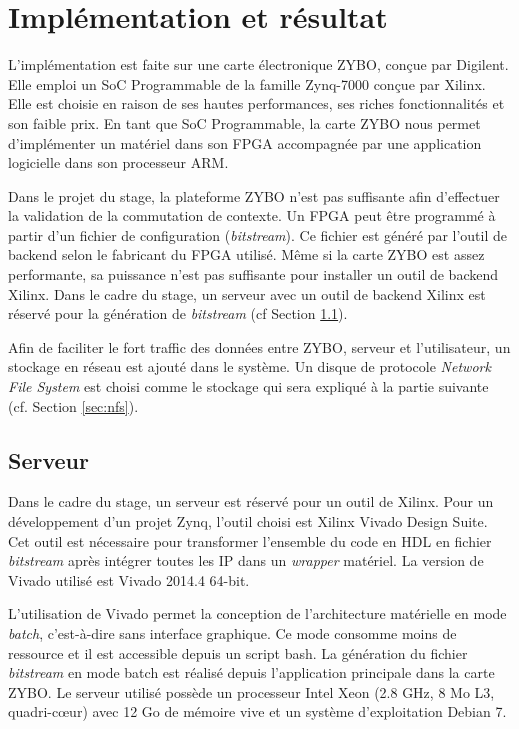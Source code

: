 \chapter{Implémentation et résultat}
\label{chap:implementation}
L'implémentation est faite sur une carte électronique ZYBO\cite{zyboweb}, 
conçue par Digilent. Elle emploi un SoC Programmable de la famille Zynq-7000 conçue par Xilinx.
Elle est choisie en raison de ses hautes performances, ses riches fonctionnalités et son faible prix. 
En tant que SoC Programmable, la carte ZYBO nous permet d'implémenter
un matériel dans son FPGA accompagnée par une application logicielle dans son processeur ARM.

Dans le projet du stage, la plateforme ZYBO n'est pas suffisante afin d'effectuer la validation de
la commutation de contexte. Un FPGA peut être programmé à partir d'un fichier de configuration (\emph{bitstream}).
Ce fichier est généré par l'outil de backend selon le fabricant du FPGA utilisé.
Même si la carte ZYBO est assez performante, sa puissance n'est pas suffisante pour
installer un outil de backend Xilinx. Dans le cadre du stage, un serveur avec un outil de backend Xilinx est réservé pour la génération de
\emph{bitstream} (cf Section \ref{sec:serveur}).

Afin de faciliter le fort traffic des données entre ZYBO, serveur et l'utilisateur, un stockage en réseau
est ajouté dans le système. Un disque de protocole \emph{Network File System} est choisi comme le stockage
qui sera expliqué à la partie suivante (cf. Section \ref{sec:nfs}).

\section{Serveur}
\label{sec:serveur}
Dans le cadre du stage, un serveur est réservé pour un outil de Xilinx.
Pour un développement d'un projet Zynq, l'outil choisi est Xilinx Vivado Design Suite.
Cet outil est nécessaire pour transformer l'ensemble du code en HDL en fichier \emph{bitstream} après
intégrer toutes les IP dans un \emph{wrapper} matériel.
La version de Vivado utilisé est Vivado 2014.4 64-bit.

L'utilisation de Vivado permet la conception de l'architecture matérielle en mode \emph{batch}, c'est-à-dire sans interface
graphique. Ce mode consomme moins de ressource et il est accessible depuis un script bash.
La génération du fichier \emph{bitstream} en mode batch est réalisé depuis
l'application principale dans la carte ZYBO.
Le serveur utilisé possède un processeur Intel Xeon (2.8 GHz, 8 Mo L3, quadri-cœur)
avec 12 Go de mémoire vive et un système d'exploitation Debian 7.

